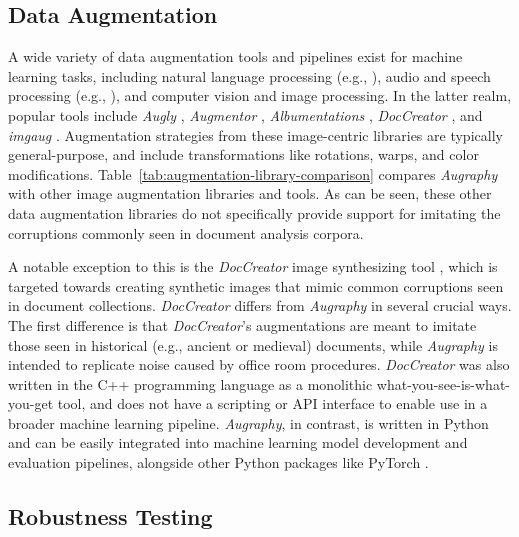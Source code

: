 \documentclass[runningheads]{llncs}
\begin{document}
\subsection{Data Augmentation}
A wide variety of data augmentation tools and pipelines exist for machine learning tasks, including  natural language processing (e.g., \cite{feng-etal-2021-survey,fadaee-etal-2017-data,wei-zou-2019-eda}), audio and speech processing (e.g., \cite{ko15_interspeech,audiogmenter,audio-framework}), and computer vision and image processing.
In the latter realm, popular tools include \emph{Augly} \cite{Papakipos2022-gq-augly}, \emph{Augmentor} \cite{augmentor}, \emph{Albumentations} \cite{ref_albumentations}, \emph{DocCreator} \cite{ref_DocCreator}, and \emph{imgaug} \cite{ref_imgaug}.
Augmentation strategies from these image-centric libraries are typically general-purpose, and include transformations like rotations, warps, and color modifications.
Table~\ref{tab:augmentation-library-comparison} compares \emph{Augraphy} with other image augmentation libraries and tools.
As can be seen, these other data augmentation libraries do not specifically provide support for imitating the corruptions commonly seen in document analysis corpora.

A notable exception to this is the \emph{DocCreator} image synthesizing tool \cite{ref_DocCreator}, which is targeted towards creating synthetic images that mimic common corruptions seen in document collections.
\emph{DocCreator} differs from \emph{Augraphy} in several crucial ways.
The first difference is that \emph{DocCreator}'s augmentations are meant to imitate those seen in historical (e.g., ancient or medieval) documents, while \emph{Augraphy} is intended to replicate noise caused by office room procedures.
\emph{DocCreator} was also written in the C++ programming language as a monolithic what-you-see-is-what-you-get tool, and does not have a scripting or API interface to enable use in a broader machine learning pipeline.
\emph{Augraphy}, in contrast, is written in Python and can be easily integrated into machine learning model development and evaluation pipelines, alongside other Python packages like PyTorch \cite{ref_pytorch}.

\subsection{Robustness Testing}
\end{document}
